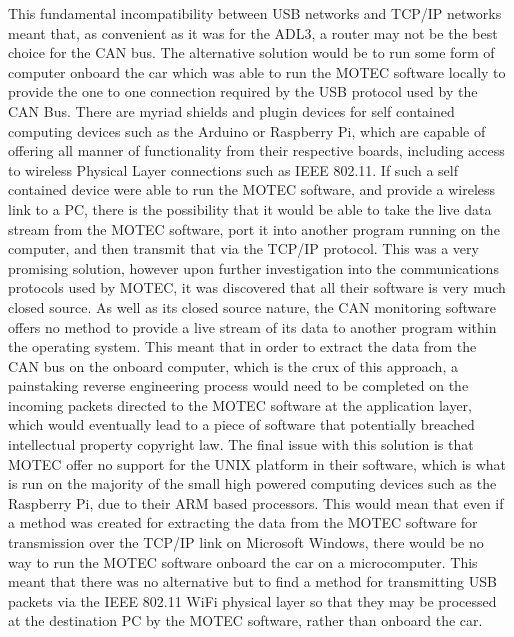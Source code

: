 This fundamental incompatibility between USB networks and TCP/IP networks meant that, as convenient as it was for the ADL3, a router may not be the best choice for the CAN bus. The alternative solution would be to run some form of computer onboard the car which was able to run the MOTEC software locally to provide the one to one connection required by the USB protocol used by the CAN Bus\cite{MAN_UTC}. There are myriad shields and plugin devices for self contained computing devices such as the Arduino or Raspberry Pi, which are capable of offering all manner of functionality from their respective boards, including access to wireless Physical Layer connections such as IEEE 802.11\cite{shieldlist}\cite{raspberry_pi_wireless}. If such a self contained device were able to run the MOTEC software, and provide a wireless link to a PC, there is the possibility that it would be able to take the live data stream from the MOTEC software, port it into another program running on the computer, and then transmit that via the TCP/IP protocol. This was a very promising solution, however upon further investigation into the communications protocols used by MOTEC, it was discovered that all their software is very much closed source\cite{MAN_ADL3}. As well as its closed source nature, the CAN monitoring software offers no method to provide a live stream of its data to another program within the operating system\cite{MAN_ECU_MANAGER}. This meant that in order to extract the data from the CAN bus on the onboard computer, which is the crux of this approach, a painstaking reverse engineering process would need to be completed on the incoming packets directed to the MOTEC software at the application layer, which would eventually lead to a piece of software that potentially breached intellectual property copyright law. The final issue with this solution is that MOTEC offer no support for the UNIX platform in their software, which is what is run on the majority of the small high powered computing devices such as the Raspberry Pi, due to their ARM based processors\cite{raspberry_pi_windows}. This would mean that even if a method was created for extracting the data from the MOTEC software for transmission over the TCP/IP link on Microsoft Windows, there would be no way to run the MOTEC software onboard the car on a microcomputer. This meant that there was no alternative but to find a method for transmitting USB packets via the IEEE 802.11 WiFi physical layer so that they may be processed at the destination PC by the MOTEC software, rather than onboard the car.

